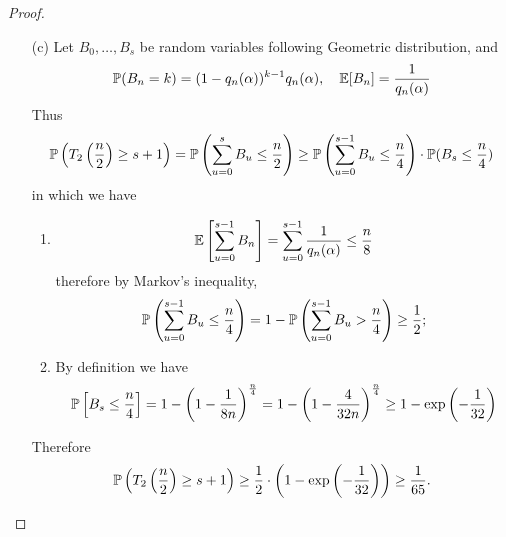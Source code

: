 \begin{proof}
\begin{itemize}
    \item[(c)] Let $B_0, \dots, B_s$ be random variables following Geometric distribution, and
    \begin{equation}
        \mathbb{P}(B_n = k) = (1 - q_n(\alpha))^{k-1} q_n(\alpha), \quad \mathbb{E}[B_n] = \frac{1}{q_n(\alpha)}\notag
    \end{equation}
    Thus
    \begin{equation}
        \mathbb{P}\left(T_2\left(\frac{n}{2}\right) \geq s+1\right) = \mathbb{P}\left( \sum_{u=0}^s B_u \leq \frac{n}{2} \right) \geq \mathbb{P}\left( \sum_{u=0}^{s-1} B_u \leq \frac{n}{4} \right) \cdot \mathbb{P}(B_s \leq \frac{n}{4})\notag
    \end{equation}
    in which we have
    \begin{enumerate}
        \item 
        \begin{equation}
            \mathbb{E}\left[ \sum_{u=0}^{s-1} B_n\right] = \sum_{u=0}^{s-1} \frac{1}{q_n(\alpha)} \leq \frac{n}{8}\notag
        \end{equation}
        therefore by Markov's inequality,
        \begin{equation}
            \mathbb{P}\left( \sum_{u=0}^{s-1} B_u \leq \frac{n}{4} \right) = 1 - \mathbb{P}\left( \sum_{u=0}^{s-1} B_u > \frac{n}{4} \right) \geq \frac{1}{2};\notag
        \end{equation}
        \item By definition we have
        \begin{equation}
            \mathbb{P}\left[ B_s \leq \frac{n}{4} \right] =  1 - \left( 1 - \frac{1}{8n}\right)^{\frac{n}{4}} = 1 - \left( 1 - \frac{4}{32 n}\right)^{\frac{n}{4}} \geq 1 - \exp\left(-\frac{1}{32}\right)\notag
        \end{equation}
    \end{enumerate}
    Therefore
    \begin{equation}
        \mathbb{P}\left(T_2\left(\frac{n}{2}\right) \geq s+1\right) \geq \frac{1}{2} \cdot \left( 1 - \exp\left(-\frac{1}{32}\right) \right) \geq \frac{1}{65}.\notag
    \end{equation}
\end{itemize}
\end{proof}

